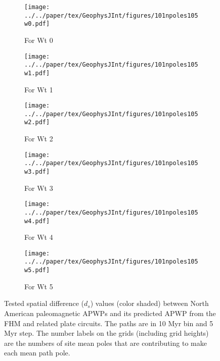 \begin{figure*}
	\centering
	\begin{subfigure}{.495\textwidth}
		\texttt{[image: ../../paper/tex/GeophysJInt/figures/101npoles105w0.pdf]}
		\caption{For Wt 0}\label{fig-na-dsw0}
	\end{subfigure}
	\vspace{.1em}
	\begin{subfigure}{.495\textwidth}
		\texttt{[image: ../../paper/tex/GeophysJInt/figures/101npoles105w1.pdf]}
		\caption{For Wt 1}\label{fig-na-dsw1}
	\end{subfigure}
	\vspace{.1em}
	\begin{subfigure}{.495\textwidth}
		\texttt{[image: ../../paper/tex/GeophysJInt/figures/101npoles105w2.pdf]}
		\caption{For Wt 2}\label{fig-na-dsw2}
	\end{subfigure}
	\vspace{.1em}
	\begin{subfigure}{.495\textwidth}
		\texttt{[image: ../../paper/tex/GeophysJInt/figures/101npoles105w3.pdf]}
		\caption{For Wt 3}\label{fig-na-dsw3}
	\end{subfigure}
	\vspace{.1em}
	\begin{subfigure}{.495\textwidth}
		\texttt{[image: ../../paper/tex/GeophysJInt/figures/101npoles105w4.pdf]}
		\caption{For Wt 4}\label{fig-na-dsw4}
	\end{subfigure}
	\vspace{.1em}
	\begin{subfigure}{.495\textwidth}
		\texttt{[image: ../../paper/tex/GeophysJInt/figures/101npoles105w5.pdf]}
		\caption{For Wt 5}\label{fig-na-dsw5}
	\end{subfigure}
	\caption[$d_s$ of each pair of poles for North American 10/5 Myr APWPs]{Tested
spatial difference ($d_s$) values (color shaded) between North American
paleomagnetic APWPs and its predicted APWP from the FHM and related plate
circuits. The paths are in 10 Myr bin and 5 Myr step. The number labels on the
grids (including grid heights) are the numbers of site mean poles that are
contributing to make each mean path pole.}\label{fig-nads}
\end{figure*}

